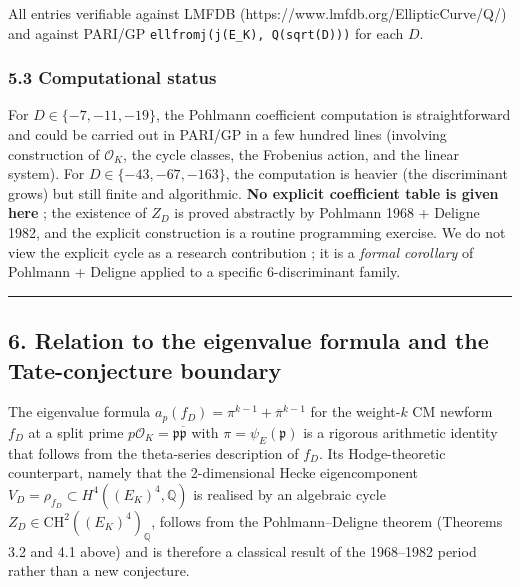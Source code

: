 \documentclass[
  11pt,
  a4paper,
]{article}
\begin{document}
All entries verifiable against LMFDB (https://www.lmfdb.org/EllipticCurve/Q/) and against PARI/GP \texttt{ellfromj(j(E\_K),\ Q(sqrt(D)))} for each \(D\).

\hypertarget{computational-status}{%
\subsubsection{5.3 Computational status}\label{computational-status}}

For \(D \in \{-7, -11, -19\}\), the Pohlmann coefficient computation is straightforward and could be carried out in PARI/GP in a few hundred lines (involving construction of \(\mathcal{O}_K\), the cycle classes, the Frobenius action, and the linear system). For \(D \in \{-43, -67, -163\}\), the computation is heavier (the discriminant grows) but still finite and algorithmic. \textbf{No explicit coefficient table is given here} ; the existence of \(Z_D\) is proved abstractly by Pohlmann 1968 + Deligne 1982, and the explicit construction is a routine programming exercise. We do not view the explicit cycle as a research contribution ; it is a \emph{formal corollary} of Pohlmann + Deligne applied to a specific 6-discriminant family.

\begin{center}\rule{0.5\linewidth}{0.5pt}\end{center}

\hypertarget{relation-to-the-eigenvalue-formula-and-the-tate-conjecture-boundary}{%
\subsection{6. Relation to the eigenvalue formula and the Tate-conjecture boundary}\label{relation-to-the-eigenvalue-formula-and-the-tate-conjecture-boundary}}

The eigenvalue formula \(a_p(f_D) = \pi^{k-1} + \overline{\pi}^{k-1}\) for the weight-\(k\) CM newform \(f_D\) at a split prime \(p \mathcal{O}_K = \mathfrak{p}\overline{\mathfrak{p}}\) with \(\pi = \psi_E(\mathfrak{p})\) is a rigorous arithmetic identity that follows from the theta-series description of \(f_D\). Its Hodge-theoretic counterpart, namely that the 2-dimensional Hecke eigencomponent \(V_D = \rho_{f_D} \subset H^4((E_K)^4, \mathbb{Q})\) is realised by an algebraic cycle \(Z_D \in \mathrm{CH}^2((E_K)^4)_\mathbb{Q}\), follows from the Pohlmann--Deligne theorem (Theorems 3.2 and 4.1 above) and is therefore a classical result of the 1968--1982 period rather than a new conjecture.
\end{document}
